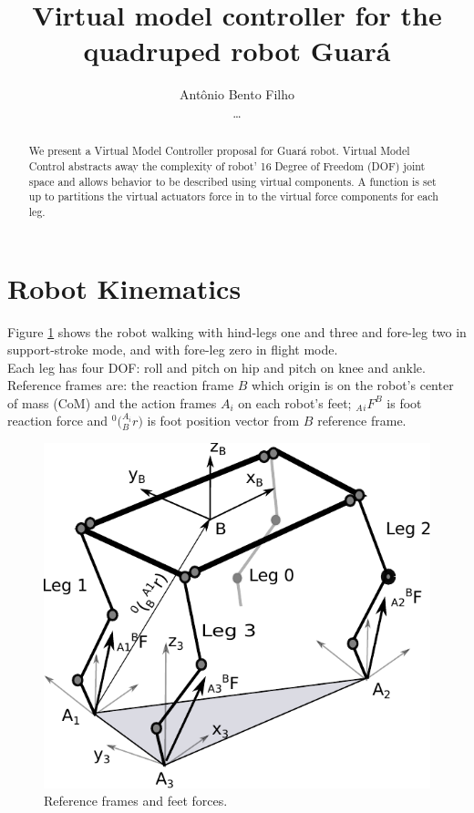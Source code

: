 \documentclass[]{article}
\title{Virtual model controller for the quadruped robot Guar\'a}
\author{Ant\^onio Bento Filho\\\dots}
\begin{document}
\maketitle

\begin{abstract}
We present a Virtual Model Controller \cite{pratt_virtual_1996} proposal for Guará robot. Virtual Model Control abstracts away the complexity of robot' 16 Degree of Freedom (DOF) joint space and allows behavior to be described using virtual components. A function is set up to partitions the virtual actuators force in to the virtual force components for each leg.
\end{abstract}
\section{Robot Kinematics}%
Figure \ref{fig:guarawolflegs} shows the robot walking with hind-legs one and three  and fore-leg two in support-stroke mode, and with fore-leg zero in flight mode.\\ Each leg has four DOF: roll and pitch on hip and pitch on knee and ankle. Reference frames are: the reaction frame $B$ which origin is on the robot's center of mass (CoM) and the action frames $A_i$ on each robot's feet; $_A{_i}F^B$ is foot reaction force and $^0({_B^{A_i}r)}$ is foot position vector from $B$ reference frame. 	
\begin{figure}%
	\centering
	\includegraphics[scale=0.5]{"Figuras/GuaraWolfLegs"}
	\caption{Reference frames and feet forces.}
	\label{fig:guarawolflegs}
\end{figure}
\end{document}
